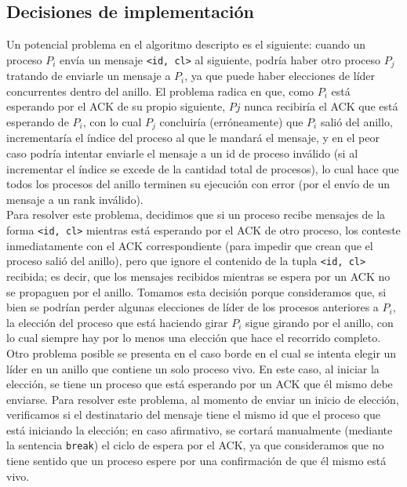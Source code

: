 \subsection{Decisiones de implementación}

Un potencial problema en el algoritmo descripto es el siguiente: cuando un
proceso $P_{i}$ envía un mensaje \verb|<id, cl>| al siguiente, podría haber
otro proceso $P_{j}$ tratando de enviarle un mensaje a $P_{i}$, ya que puede
haber elecciones de líder concurrentes dentro del anillo. El problema radica en
que, como $P_{i}$ está esperando por el ACK de su propio siguiente, $P{j}$ nunca
recibiría el ACK que está esperando de $P_{i}$, con lo cual $P_{j}$ concluiría
(erróneamente) que $P_{i}$ salió del anillo, incrementaría el índice del proceso
al que le mandará el mensaje, y en el peor caso podría intentar enviarle el
mensaje a un id de proceso inválido (si al incrementar el índice se excede
de la cantidad total de procesos), lo cual hace que todos los procesos del
anillo terminen su ejecución con error (por el envío de un mensaje a un rank
inválido). \\

Para resolver este problema, decidimos que si un proceso recibe mensajes de la
forma \verb|<id, cl>| mientras está esperando por el ACK de otro proceso, los
conteste inmediatamente con el ACK correspondiente (para impedir que crean que el
proceso salió del anillo), pero que ignore el contenido de la tupla
\verb|<id, cl>| recibida; es decir, que los mensajes recibidos mientras se espera
por un ACK no se propaguen por el anillo.
Tomamos esta decisión porque consideramos que, si bien se podrían
perder algunas elecciones de líder de los procesos anteriores a $P_{i}$,
la elección del proceso que está haciendo girar $P_{i}$ sigue girando por el
anillo, con lo cual siempre hay por lo menos una elección que hace el recorrido
completo. \\

Otro problema posible se presenta en el caso borde en el cual se intenta elegir un líder en
un anillo que contiene un solo proceso vivo. En este caso, al iniciar la
elección, se tiene un proceso que está esperando por un ACK que él mismo debe
enviarse. Para resolver este problema, al momento de enviar un inicio de
elección, verificamos si el destinatario del mensaje tiene el mismo id que el
proceso que está iniciando la elección; en caso afirmativo, se cortará
manualmente (mediante la sentencia \verb|break|) el ciclo de espera por el ACK, ya que
consideramos que no tiene sentido que un proceso espere por una confirmación de
que él mismo está vivo.
